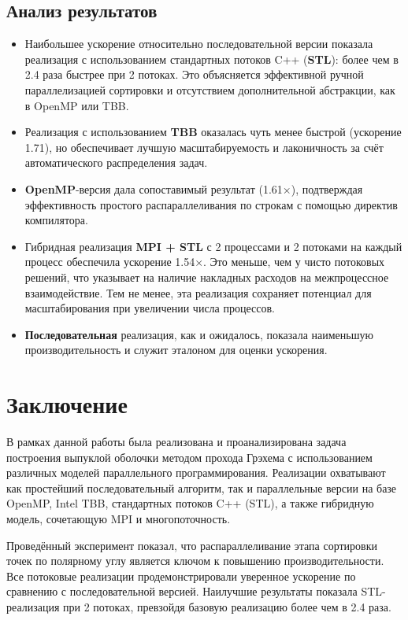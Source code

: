 \documentclass[12pt,a4paper]{extarticle}
\begin{document}
\subsection{Анализ результатов}

\begin{itemize}
    \item Наибольшее ускорение относительно последовательной версии показала реализация с использованием стандартных потоков C++ (\textbf{STL}): более чем в 2.4 раза быстрее при 2 потоках. Это объясняется эффективной ручной параллелизацией сортировки и отсутствием дополнительной абстракции, как в OpenMP или TBB.

    \item Реализация с использованием \textbf{TBB} оказалась чуть менее быстрой (ускорение 1.71), но обеспечивает лучшую масштабируемость и лаконичность за счёт автоматического распределения задач.

    \item \textbf{OpenMP}-версия дала сопоставимый результат (1.61×), подтверждая эффективность простого распараллеливания по строкам с помощью директив компилятора.

    \item Гибридная реализация \textbf{MPI + STL} с 2 процессами и 2 потоками на каждый процесс обеспечила ускорение 1.54×. Это меньше, чем у чисто потоковых решений, что указывает на наличие накладных расходов на межпроцессное взаимодействие. Тем не менее, эта реализация сохраняет потенциал для масштабирования при увеличении числа процессов.

    \item \textbf{Последовательная} реализация, как и ожидалось, показала наименьшую производительность и служит эталоном для оценки ускорения.
\end{itemize}

\section{Заключение}

В рамках данной работы была реализована и проанализирована задача построения выпуклой оболочки методом прохода Грэхема с использованием различных моделей параллельного программирования. Реализации охватывают как простейший последовательный алгоритм, так и параллельные версии на базе OpenMP, Intel TBB, стандартных потоков C++ (STL), а также гибридную модель, сочетающую MPI и многопоточность.

Проведённый эксперимент показал, что распараллеливание этапа сортировки точек по полярному углу является ключом к повышению производительности. Все потоковые реализации продемонстрировали уверенное ускорение по сравнению с последовательной версией. Наилучшие результаты показала STL-реализация при 2 потоках, превзойдя базовую реализацию более чем в 2.4 раза.
\end{document}
